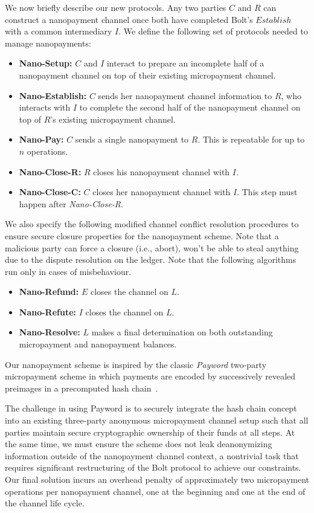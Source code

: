 We now briefly describe our new protocols.
Any two parties $C$ and $R$ can construct a nanopayment channel once both have completed Bolt's $Establish$ with a common intermediary $I$.
We define the following set of protocols needed to manage nanopayments:

\begin{itemize}[label={}]
\item \textbf{Nano-Setup:} $C$ and $I$ interact to prepare an incomplete half of a nanopayment channel on top of their existing micropayment channel.
\item \textbf{Nano-Establish:} $C$ sends her nanopayment channel information to $R$, who interacts with $I$ to complete the second half of the nanopayment channel on top of $R$'s existing micropayment channel.
\item \textbf{Nano-Pay:} $C$ sends a single nanopayment to $R$.
This is repeatable for up to $n$ operations.
\item \textbf{Nano-Close-R:} $R$ closes his nanopayment channel with $I$.
\item \textbf{Nano-Close-C:} $C$ closes her nanopayment channel with $I$.
This step must happen after \emph{Nano-Close-R}.
\end{itemize}

We also specify the following modified channel conflict resolution procedures to ensure secure closure properties for the nanopayment scheme.
Note that a
malicious party can force a closure (i.e., abort), won't be able to steal anything due to the dispute resolution on the ledger.
Note that the following algorithms run only in cases of misbehaviour.

\begin{itemize}[label={}]
\item \textbf{Nano-Refund:} $E$ closes the channel on $L$.
\item \textbf{Nano-Refute:} $I$ closes the channel on $L$.
\item \textbf{Nano-Resolve:} $L$ makes a final determination on both outstanding micropayment
  and nanopayment balances.
\end{itemize}

Our nanopayment scheme is inspired by the classic \emph{Payword} two-party micropayment scheme in which payments are encoded by successively revealed preimages in a precomputed hash chain~\cite{rivest1996payword}.

The challenge in using Payword is to securely integrate the hash chain concept into an existing three-party anonymous micropayment channel setup such that all parties maintain secure cryptographic ownership of their funds at all steps.
At the same time, we must ensure the scheme does not leak deanonymizing information outside of the nanopayment channel context, a nontrivial task that requires significant restructuring of the Bolt protocol to achieve our constraints.
Our final solution incurs an overhead penalty of approximately two micropayment operations per nanopayment channel, one at the beginning and one at the end of the channel life cycle.

